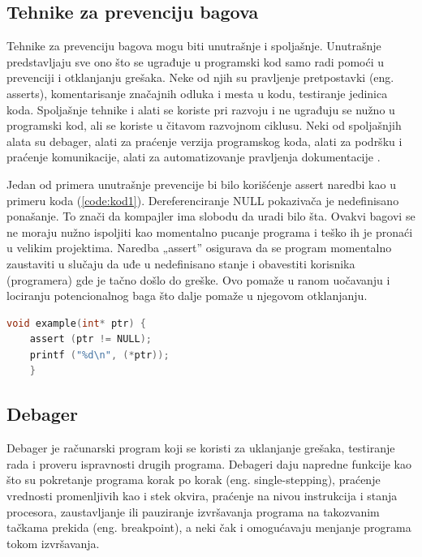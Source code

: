 \documentclass[a4paper]{article}
\begin{document}
\subsection{Tehnike za prevenciju bagova}
\label{subsec:Tehnike za prevenciju bagova}

Tehnike za prevenciju bagova mogu biti unutrašnje i spoljašnje. Unutrašnje predstavljaju sve ono što se ugrađuje u programski kod samo radi pomoći u prevenciji i otklanjanju grešaka. Neke od njih su pravljenje pretpostavki (eng. asserts), komentarisanje značajnih odluka i mesta u kodu, testiranje jedinica koda. Spoljašnje tehnike i alati se koriste pri razvoju i ne ugrađuju se nužno u programski kod, ali se koriste u čitavom razvojnom ciklusu. Neki od spoljašnjih alata su debager, alati za praćenje verzija programskog koda, alati za podršku i praćenje komunikacije, alati za automatizovanje pravljenja dokumentacije \cite{bagovi_smalkov}.  

Jedan od primera unutrašnje prevencije bi bilo korišćenje assert naredbi kao u primeru koda (\ref{code:kod1}). Dereferenciranje NULL pokazivača je nedefinisano ponašanje. To znači da kompajler ima slobodu da uradi bilo šta. Ovakvi bagovi se ne moraju nužno ispoljiti kao momentalno pucanje programa i teško ih je pronaći u velikim projektima. Naredba „assert” osigurava da se program momentalno zaustaviti u slučaju da uđe u nedefinisano stanje i obavestiti korisnika (programera) gde je tačno došlo do greške. Ovo pomaže u ranom uočavanju i lociranju potencionalnog baga što dalje pomaže u njegovom otklanjanju.\\

\begin{center}
	\begin{lstlisting}[language=C,caption=Primer upotrebe assert naredbe, label=code:kod1]
	void example(int* ptr) {
	assert (ptr != NULL);
	printf ("%d\n", (*ptr));
	}
	\end{lstlisting}
\end{center}


\subsection{Debager}
\label{subsec:Debager}

Debager je računarski program koji se koristi za uklanjanje grešaka, testiranje rada i proveru ispravnosti drugih programa. Debageri daju napredne funkcije kao što su pokretanje programa korak po korak (eng. single-stepping), praćenje vrednosti promenljivih kao i stek okvira, praćenje na nivou instrukcija i stanja procesora, zaustavljanje ili pauziranje izvršavanja programa na takozvanim tačkama prekida (eng. breakpoint), a neki čak i omogućavaju menjanje programa tokom izvršavanja.
\end{document}
